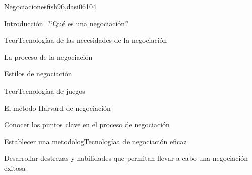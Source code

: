 \begin{syllabus}
\begin{unit}{Negociaciones}{fish96,dasi06}{10}{4}
\begin{topics}
      \item Introducción. ?`Qué es una negociación?
      \item TeorTecnologíaa de las necesidades de la negociación
      \item La proceso de la negociación
      \item Estilos de negociación
      \item TeorTecnologíaa de juegos
      \item El método Harvard de negociación
   \end{topics}
   \begin{learningoutcomes}
      \item Conocer los puntos clave en el proceso de negociación
      \item Establecer una metodologTecnologíaa de negociación eficaz
      \item Desarrollar destrezas y habilidades que permitan llevar a cabo una negociación exitosa
   \end{learningoutcomes}
\end{unit}



\begin{coursebibliography}
\end{coursebibliography}

\end{syllabus}

%
